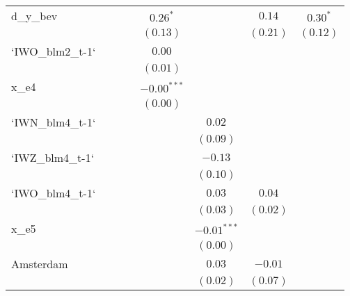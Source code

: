 \begin{center}
\begin{longtable}{l c c c c c c c }
d\_y\_bev        &               &              &               & $0.26^{*}$    &               & $0.14$        & $0.30^{*}$    \\
                 &               &              &               & $(0.13)$      &               & $(0.21)$      & $(0.12)$      \\
`IWO\_blm2\_t-1` &               &              &               & $0.00$        &               &               &               \\
                 &               &              &               & $(0.01)$      &               &               &               \\
x\_e4            &               &              &               & $-0.00^{***}$ &               &               &               \\
                 &               &              &               & $(0.00)$      &               &               &               \\
`IWN\_blm4\_t-1` &               &              &               &               & $0.02$        &               &               \\
                 &               &              &               &               & $(0.09)$      &               &               \\
`IWZ\_blm4\_t-1` &               &              &               &               & $-0.13$       &               &               \\
                 &               &              &               &               & $(0.10)$      &               &               \\
`IWO\_blm4\_t-1` &               &              &               &               & $0.03$        & $0.04$        &               \\
                 &               &              &               &               & $(0.03)$      & $(0.02)$      &               \\
x\_e5            &               &              &               &               & $-0.01^{***}$ &               &               \\
                 &               &              &               &               & $(0.00)$      &               &               \\
Amsterdam        &               &              &               &               & $0.03$        & $-0.01$       &               \\
                 &               &              &               &               & $(0.02)$      & $(0.07)$      &               \\

\end{longtable}
\end{center}
